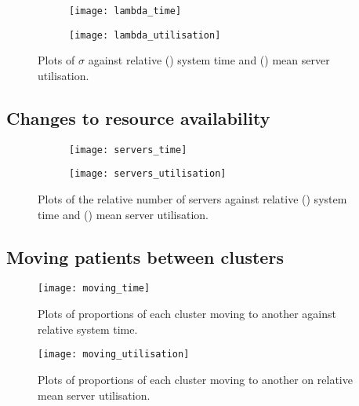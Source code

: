 \begin{figure}
    \centering
    \begin{subfigure}{.5\imgwidth}
        \texttt{[image: lambda\_time]}
        \caption{}\label{fig:lambda_time}
    \end{subfigure}\hfill%
    \begin{subfigure}{.5\imgwidth}
        \texttt{[image: lambda\_utilisation]}
        \caption{}\label{fig:lambda_utilisation}
    \end{subfigure}
    \caption{%
        Plots of \(\sigma\) against relative () system
        time and () mean server utilisation.
    }\label{fig:lambda}
\end{figure}


\subsection{Changes to resource availability}\label{subsec:resources}

\begin{figure}
    \centering
    \begin{subfigure}{.5\imgwidth}
        \texttt{[image: servers\_time]}
        \caption{}\label{fig:servers_time}
    \end{subfigure}\hfill%
    \begin{subfigure}{.5\imgwidth}
        \texttt{[image: servers\_utilisation]}
        \caption{}\label{fig:servers_utilisation}
    \end{subfigure}
    \caption{%
        Plots of the relative number of servers against relative
        () system time and
        () mean server utilisation.
    }
\end{figure}


\subsection{Moving patients between clusters}\label{subsec:moving}

\begin{figure}
    \centering
    \texttt{[image: moving\_time]}
    \caption{%
        Plots of proportions of each cluster moving to another against relative
        system time.
    }\label{fig:moving_time}
\end{figure}

\begin{figure}
    \centering
    \texttt{[image: moving\_utilisation]}
    \caption{%
        Plots of proportions of each cluster moving to another on relative mean
        server utilisation.
    }\label{fig:moving_utilisation}
\end{figure}
